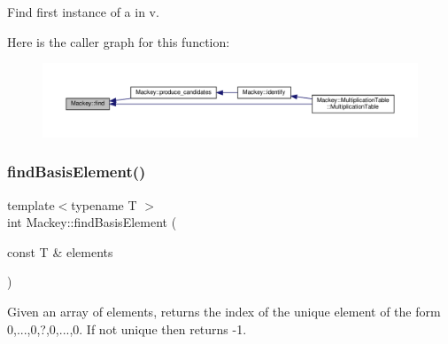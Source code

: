 Find first instance of a in v. 

Here is the caller graph for this function\+:\nopagebreak
\begin{figure}[H]
\begin{center}
\leavevmode
\includegraphics[width=350pt]{namespaceMackey_a74984d054f1f943ab61dd0415347f141_icgraph}
\end{center}
\end{figure}
\mbox{\label{namespaceMackey_ab5bc349f95c14d448e42622de2d6a448}} 
\subsubsection{\texorpdfstring{find\+Basis\+Element()}{findBasisElement()}}
{\footnotesize\ttfamily template$<$typename T $>$ \\
int Mackey\+::find\+Basis\+Element (\begin{DoxyParamCaption}\item[{const T \&}]{elements }\end{DoxyParamCaption})}



Given an array of elements, returns the index of the unique element of the form 0,...,0,?,0,...,0. If not unique then returns -\/1. 

